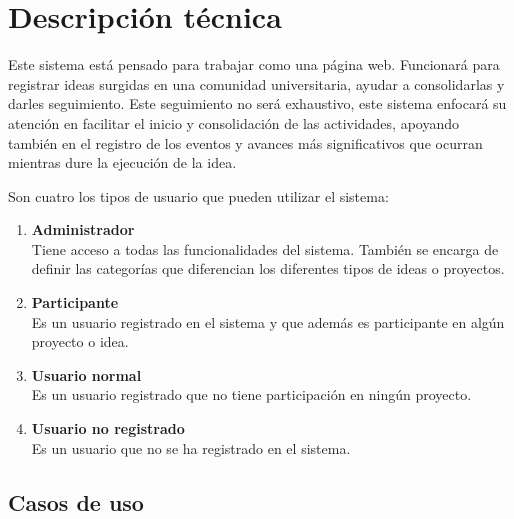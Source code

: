 \documentclass[11pt,letterpaper,titlepage]{article}
\begin{document}
\section{Descripci\'on t\'ecnica}

Este sistema est\'a pensado para trabajar como una p\'agina web. Funcionar\'a para registrar ideas surgidas en una comunidad universitaria, ayudar a consolidarlas y darles seguimiento. Este seguimiento no ser\'a exhaustivo, este sistema enfocar\'a su atenci\'on  en facilitar el inicio  y consolidaci\'on de las actividades, apoyando tambi\'en en el registro de los eventos y avances m\'as significativos que ocurran mientras dure la ejecuci\'on de la idea.

Son cuatro los tipos de usuario que pueden utilizar el sistema:
\begin{enumerate}
 \item \textbf{Administrador}\\Tiene acceso a todas las funcionalidades del sistema. Tambi\'en se encarga de definir las categor\'ias que diferencian los diferentes tipos de ideas o proyectos.
 \item \textbf{Participante}\\Es un usuario registrado en el sistema y que adem\'as  es participante en alg\'un proyecto o idea.
 \item \textbf{Usuario normal}\\Es un usuario registrado que no tiene participaci\'on en ning\'un proyecto.
 \item \textbf{Usuario no registrado}\\Es un usuario que no se ha registrado en el sistema.
\end{enumerate}




\newpage
\subsection{Casos de uso}
\end{document}
